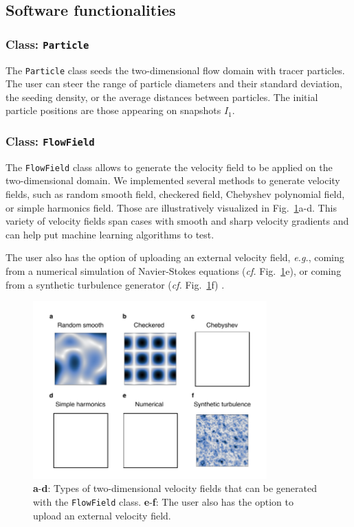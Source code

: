 \documentclass[a4paper,fleqn]{cas-dc}
\begin{document}
\subsection{Software functionalities}

\subsubsection{Class: \texttt{Particle}} \label{sec:class-Particle}

The \texttt{Particle} class seeds the two-dimensional flow domain with tracer particles. The user can steer the range of particle diameters and their standard deviation, the seeding density, or the average distances between particles. The initial particle positions are those appearing on snapshots $I_1$.

\subsubsection{Class: \texttt{FlowField}} \label{sec:class-FlowField}

The \texttt{FlowField} class allows to generate the velocity field to be applied on the two-dimensional domain. We implemented several methods to generate velocity fields, such as random smooth field, checkered field, Chebyshev polynomial field, or simple harmonics field. Those are illustratively visualized in Fig.~\ref{fig:velocity-fields}a-d. This variety of velocity fields span cases with smooth and sharp velocity gradients and can help put machine learning algorithms to test.

The user also has the option of uploading an external velocity field, \textit{e.g.}, coming from a numerical simulation of Navier-Stokes equations (\textit{cf.} Fig.~\ref{fig:velocity-fields}e), or coming from a synthetic turbulence generator (\textit{cf.} Fig.~\ref{fig:velocity-fields}f) \citep{saad2017scalable, richards2018fast}.

\begin{figure}[t]
\centering
\includegraphics[width=9cm]{velocity-fields.pdf}
\caption{\textbf{a}-\textbf{d}: Types of two-dimensional velocity fields that can be generated with the \texttt{FlowField} class. \textbf{e}-\textbf{f}: The user also has the option to upload an external velocity field.}
\label{fig:velocity-fields}
\end{figure}
\end{document}
